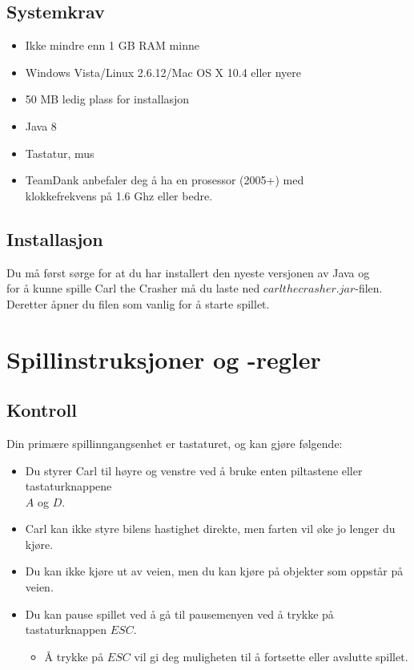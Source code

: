 \documentclass[paper=a4]{article}
\begin{document}
\subsection{Systemkrav}
\begin{itemize}
	\item Ikke mindre enn 1 GB RAM minne\\
	\item Windows Vista/Linux 2.6.12/Mac OS X 10.4 eller nyere \\
	\item 50 MB ledig plass for installasjon \\
	\item Java 8 \\
	\item Tastatur, mus \\
 	\item TeamDank anbefaler deg å ha en prosessor (2005+) med \\ 
klokkefrekvens på 1.6 Ghz eller bedre.
\end{itemize}
\subsection{Installasjon}
Du må først sørge for at du har installert den nyeste versjonen av Java og \\
for å kunne spille Carl the Crasher må du laste ned $carlthecrasher.jar$-filen. \\
Deretter åpner du filen som vanlig for å starte spillet.   
\newpage

\section{Spillinstruksjoner og -regler} 
\subsection{Kontroll} 
Din primære spillinngangsenhet er tastaturet, og kan gjøre følgende: 
\begin{itemize}
	\item Du styrer Carl til høyre og venstre ved å bruke enten piltastene eller tastaturknappene \\ $A$ og $D$. 
	\item Carl kan ikke styre bilens hastighet direkte, men farten vil øke jo lenger du kjøre.
	\item Du kan ikke kjøre ut av veien, men du kan kjøre på objekter som oppstår på veien.
	\item Du kan pause spillet ved å gå til pausemenyen ved å trykke på tastaturknappen $ESC$. 
	\begin{itemize}
		\item Å trykke på $ESC$ vil gi deg muligheten til å fortsette eller avslutte spillet.
	\end{itemize}
\end{itemize}
\end{document}
